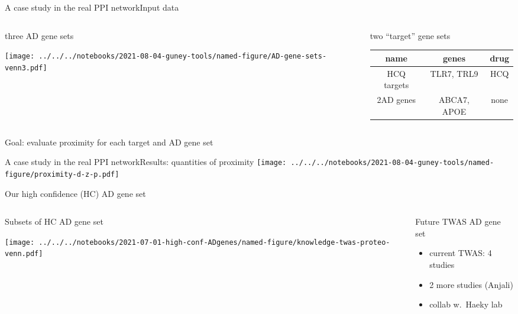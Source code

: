 \documentclass{beamer}
\begin{document}
\begin{frame}{A case study in the real PPI network}{Input data}
\begin{columns}[t]
\begin{column}{0.5\textwidth}

\begin{center}
three AD gene sets
\end{center}

\texttt{[image: ../../../notebooks/2021-08-04-guney-tools/named-figure/AD-gene-sets-venn3.pdf]}
\end{column}

\begin{column}{0.5\textwidth}

\begin{center}
two ``target'' gene sets
\end{center}
	\footnotesize
\begin{tabular}{|c|c|c|}
\hline
name & genes & drug \\
\hline
HCQ targets & TLR7, TRL9 & HCQ \\
2AD genes & ABCA7, APOE  & none \\
\hline
\end{tabular}
\end{column}
\end{columns}
\begin{center}
Goal: evaluate proximity for each target and AD gene set
\end{center}
\end{frame}

\begin{frame}{A case study in the real PPI network}{Results: quantities of proximity}
\texttt{[image: ../../../notebooks/2021-08-04-guney-tools/named-figure/proximity-d-z-p.pdf]}
\end{frame}

\begin{frame}{Our high confidence (HC) AD gene set}
\begin{columns}[t]
\begin{column}{0.5\textwidth}
Subsets of HC AD gene set

\texttt{[image: ../../../notebooks/2021-07-01-high-conf-ADgenes/named-figure/knowledge-twas-proteo-venn.pdf]}
\end{column}

\begin{column}{0.5\textwidth}
Future TWAS AD gene set
\begin{itemize}
\item current TWAS: 4 studies
\item 2 more studies (Anjali)
\item collab w.~Haeky lab
\end{itemize}

\end{column}
\end{columns}
\end{frame}
\end{document}
